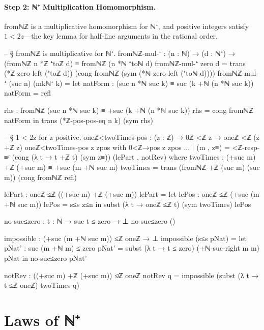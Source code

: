 \documentclass[11pt,a4paper]{book}
\def\texttt#1{#1}%
\begin{document}
\paragraph{Step 2: ℕ⁺ Multiplication Homomorphism.}
\texttt{fromℕℤ} is a multiplicative homomorphism for ℕ⁺,
and positive integers satisfy $1 < 2z$---the key lemma for
half-line arguments in the rational order.

\begin{code}
-- § fromℕℤ is multiplicative for ℕ⁺.
fromℕℤ-mul-⁺ : (n : ℕ) → (d : ℕ⁺) → (fromℕℤ n *ℤ ⁺toℤ d) ≡ fromℕℤ (n *ℕ ⁺toℕ d)
fromℕℤ-mul-⁺ zero d =
  trans
    (*ℤ-zero-left (⁺toℤ d))
    (cong fromℕℤ (sym (*ℕ-zero-left (⁺toℕ d))))
fromℕℤ-mul-⁺ (suc n) (mkℕ⁺ k) =
  let
    natForm : (suc n *ℕ suc k) ≡ suc (k +ℕ (n *ℕ suc k))
    natForm = refl

    rhs : fromℕℤ (suc n *ℕ suc k) ≡ +suc (k +ℕ (n *ℕ suc k))
    rhs = cong fromℕℤ natForm
  in
  trans
    (*ℤ-pos-pos-eq n k)
    (sym rhs)

-- § 1 < 2z for z positive.
oneℤ<twoTimes-pos : (z : ℤ) → 0ℤ <ℤ z → oneℤ <ℤ (z +ℤ z)
oneℤ<twoTimes-pos z zpos with 0<ℤ→pos z zpos
... | (m , z≡) =
  <ℤ-resp-≡ʳ (cong (λ t → t +ℤ t) (sym z≡)) (lePart , notRev)
  where
    twoTimes : (+suc m) +ℤ (+suc m) ≡ +suc (m +ℕ suc m)
    twoTimes =
      trans
        (fromℕℤ-+ℤ (suc m) (suc m))
        (cong fromℕℤ refl)

    lePart : oneℤ ≤ℤ ((+suc m) +ℤ (+suc m))
    lePart =
      let
        lePos : oneℤ ≤ℤ (+suc (m +ℕ suc m))
        lePos = s≤s z≤n
      in
        subst (λ t → oneℤ ≤ℤ t) (sym twoTimes) lePos

    no-suc≤zero : {t : ℕ} → suc t ≤ zero → ⊥
    no-suc≤zero ()

    impossible : (+suc (m +ℕ suc m)) ≤ℤ oneℤ → ⊥
    impossible (s≤s pNat) =
      let
        pNat' : suc (m +ℕ m) ≤ zero
        pNat' = subst (λ t → t ≤ zero) (+ℕ-suc-right m m) pNat
      in
      no-suc≤zero pNat'

    notRev : ((+suc m) +ℤ (+suc m)) ≰ℤ oneℤ
    notRev q = impossible (subst (λ t → t ≤ℤ oneℤ) twoTimes q)
\end{code}

\section{Laws of ℕ⁺}
\end{document}
